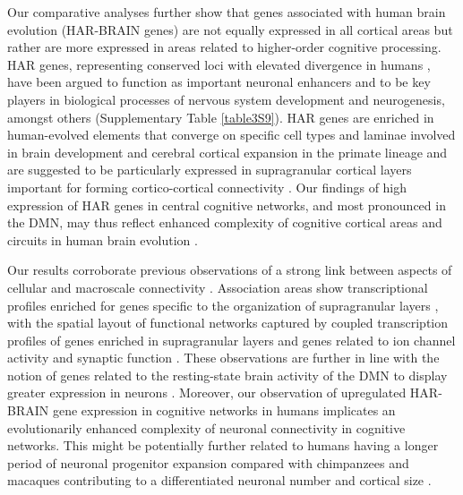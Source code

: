 \begin{refsection}
Our comparative analyses further show that genes associated with human brain evolution (HAR-BRAIN genes) are not equally expressed in all cortical areas but rather are more expressed in areas related to higher-order cognitive processing. HAR genes, representing conserved loci with elevated divergence in humans \citep{pollard2006rna,doan2016mutations}, have been argued to function as important neuronal enhancers \citep{Ryu256313} and to be key players in biological processes of nervous system development and neurogenesis, amongst others (Supplementary Table \ref{table3S9}). HAR genes are enriched in human-evolved elements that converge on specific cell types and laminae involved in brain development and cerebral cortical expansion in the primate lineage \citep{won2019human} and are suggested to be particularly expressed in supragranular cortical layers important for forming cortico-cortical connectivity \citep{won2019human}. Our findings of high expression of HAR genes in central cognitive networks, and most pronounced in the DMN, may thus reflect enhanced complexity of cognitive cortical areas and circuits in human brain evolution \citep{elston2001pyramidal,jacobs2001regional}.

Our results corroborate previous observations of a strong link between aspects of cellular and macroscale connectivity \citep{vandenheuvel2019multi,scholtens2014linking}. Association areas show transcriptional profiles enriched for genes specific to the organization of supragranular layers \citep{vertes2016gene}, with the spatial layout of functional networks captured by coupled transcription profiles of genes enriched in supragranular layers \citep{krienen2016transcriptional} and genes related to ion channel activity and synaptic function \citep{richiardi2015correlated}. These observations are further in line with the notion of genes related to the resting-state brain activity of the DMN to display greater expression in neurons \citep{wang2015correspondence}. Moreover, our observation of upregulated HAR-BRAIN gene expression in cognitive networks in humans implicates an evolutionarily enhanced complexity of neuronal connectivity in cognitive networks. This might be potentially further related to humans having a longer period of neuronal progenitor expansion compared with chimpanzees and macaques contributing to a differentiated neuronal number and cortical size \citep{otani20162d}.


\end{refsection}
